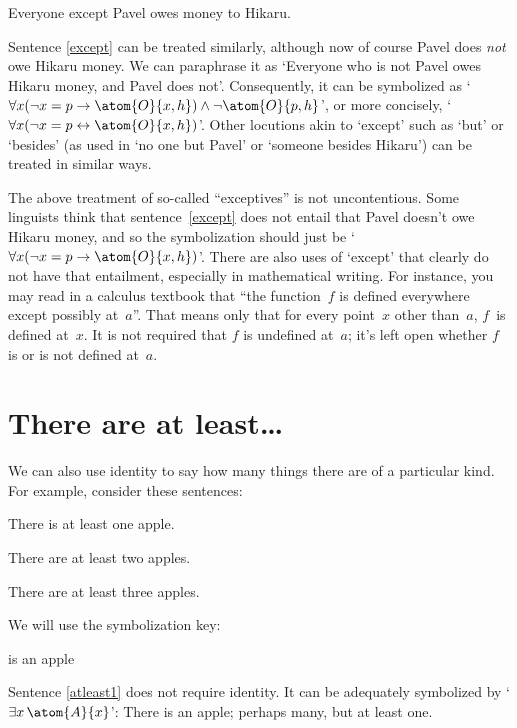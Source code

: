 \begin{earg}
	\item[\ex{except}] Everyone except Pavel owes money to Hikaru.
	\end{earg}
Sentence \ref{except} can be treated similarly, although now of course Pavel does \emph{not} owe Hikaru money. We can paraphrase it as `Everyone who is not Pavel owes Hikaru money, and Pavel does not'. Consequently, it can be symbolized as `$\forall x(\enot x = p \eif \atom{O}{x,h}) \eand \enot \atom{O}{p,h}$', or more concisely, `$\forall x(\enot x = p \eiff \atom{O}{x,h})$'. Other locutions akin to `except' such as `but' or `besides' (as used in `no one but Pavel' or `someone besides Hikaru') can be treated in similar ways.

The above treatment of so-called ``exceptives'' is not uncontentious. Some linguists think that sentence~\ref{except} does not entail that Pavel doesn't owe Hikaru money, and so the symbolization should just be `$\forall x(\enot x = p \eif \atom{O}{x,h})$'.  There are also uses of `except' that clearly do not have that entailment, especially in mathematical writing.  For instance, you may read in a calculus textbook that ``the function~$f$ is defined everywhere except possibly at~$a$''.  That means only that for every point~$x$ other than~$a$, $f$~is defined at~$x$. It is not required that $f$ is undefined at~$a$; it's left open whether $f$ is or is not defined at~$a$.

\section{There are at least\ldots}
We can also use identity to say how many things there are of a particular kind. For example, consider these sentences:
\begin{earg}
\item[\ex{atleast1}] There is at least one apple.
\item[\ex{atleast2}] There are at least two apples.
\item[\ex{atleast3}] There are at least three apples.
\end{earg}
We will use the symbolization key:
	\begin{ekey}
		\item[\atom{A}{x}]  is an apple
	\end{ekey}
Sentence \ref{atleast1} does not require identity. It can be adequately symbolized by `$\exists x\, \atom{A}{x}$': There is an apple; perhaps many, but at least one.

